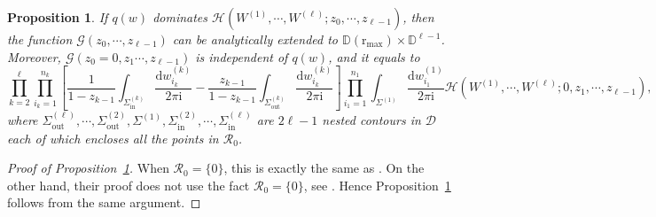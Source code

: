 \documentclass{article}
\newtheorem{prop}[thm]{Proposition}
\numberwithin{equation}{section}
\newcommand{\ddbar}[2]{\frac{{\mathrm d}#1}{2\pi {\mathrm i}#2}}
\newcommand{\inn}{\mathrm{in}}
\newcommand{\out}{\mathrm{out}}
\newcommand{\rr}{\mathrm{r_{max}}}
\begin{document}
\begin{prop}
	\label{prop:Cauchy_summation_identity}
	If $q(w)$ dominates $\mathcal{H}\left(W^{(1)},\cdots,W^{(\ell)};z_0,\cdots,z_{\ell-1}\right)$, then the function $\mathcal{G}(z_0,\cdots,z_{\ell-1})$ can be analytically extended to $\mathbb{D}(\rr)\times\mathbb{D}^{\ell-1}$. Moreover, $\mathcal{G}(z_0=0,z_1\cdots,z_{\ell-1})$ is independent of $q(w)$, and it equals to
	\begin{equation*}
		\prod_{k=2}^{\ell}\prod_{i_k=1}^{n_k} \left[\frac{1}{1-z_{k-1}} \int_{\Sigma_{\inn}^{(k)}}\ddbar{w_{i_k}^{(k)}}{} -\frac{z_{k-1}}{1-z_{k-1}}\int_{\Sigma^{(k)}_{\out}}\ddbar{w_{i_k}^{(k)}}{}\right]\prod_{i_1=1}^{n_1} \int_{\Sigma^{(1)}}\ddbar{w_{i_1}^{(1)}}{}\mathcal{H}\left(W^{(1)},\cdots,W^{(\ell)};0,z_1,\cdots,z_{\ell-1}\right),
	\end{equation*}
where $\Sigma_{\out}^{(\ell)},\cdots,\Sigma_\out^{(2)},\Sigma^{(1)},\Sigma_\inn^{(2)},\cdots,\Sigma_\inn^{(\ell)}$ are $2\ell-1$ nested contours in $\mathcal{D}$ each of which encloses all the points in $\mathcal{R}_0$.
\end{prop}
\begin{proof}[Proof of Proposition~\ref{prop:Cauchy_summation_identity}]
	When $\mathcal{R}_0=\{0\}$, this is exactly the same as \cite[Proposition 4.3]{Liu19}. On the other hand, their proof does not use the fact $\mathcal{R}_0=\{0\}$, see \cite[Section 6]{Liu19}. Hence Proposition~\ref{prop:Cauchy_summation_identity} follows from the same argument.
\end{proof}
\end{document}
